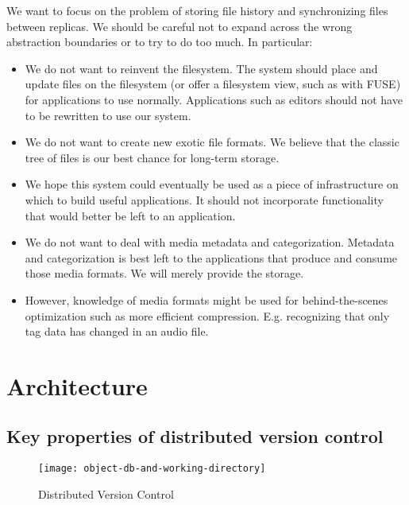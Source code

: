 \documentclass[a4paper]{article}
\begin{document}
We want to focus on the problem of storing file history and synchronizing files
between replicas.
We should be careful not to expand across the wrong abstraction boundaries or to
try to do too much.
In particular:

\begin{itemize}

  \item We do not want to reinvent the filesystem. The system should place and
    update files on the filesystem (or offer a filesystem view, such as with
    FUSE) for applications to use normally. Applications such as editors should
    not have to be rewritten to use our system.

  \item We do not want to create new exotic file formats. We believe that the
    classic tree of files is our best chance for long-term storage.

  \item We hope this system could eventually be used as a piece of
    infrastructure on which to build useful applications. It should not
    incorporate functionality that would better be left to an application.

  \item We do not want to deal with media metadata and categorization. Metadata
    and categorization is best left to the applications that produce and consume
    those media formats. We will merely provide the storage.

  \item However, knowledge of media formats might be used for behind-the-scenes
    optimization such as more efficient compression. E.g. recognizing that only
    tag data has changed in an audio file.

\end{itemize}


\section{Architecture}\label{architecture}


\subsection{Key properties of distributed version control}

\begin{figure}[h!]
  \caption{Distributed Version Control}
  \label{fig:object-db-and-working-directory}
  \centering
    \texttt{[image: object-db-and-working-directory]}
\end{figure}
\end{document}
